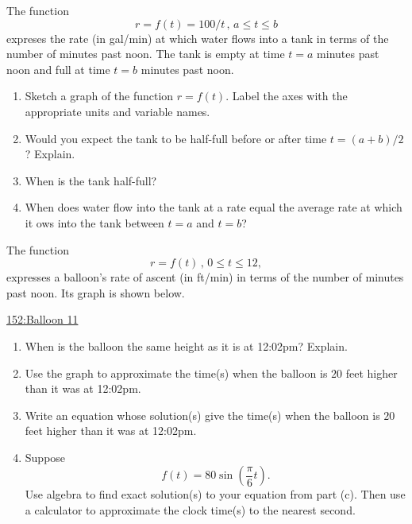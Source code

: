 \documentclass{ximera}
\begin{document}
\begin{question} \label{QLkdR343RE}
The function 
\[
r = f(t) = 100/t \, , \, a \leq  t \leq b
\]
expreses the rate (in gal/min) at which water flows into a tank in terms of the number of minutes past noon. The tank
 is empty at time $t = a$ minutes past noon and full at time $t = b$ minutes past noon.

\begin{enumerate}
\item Sketch a graph of the function $r = f(t)$. Label the axes with the appropriate units and variable names.

\item Would you expect the tank to be half-full before or after time $t = (a+b)/2$? Explain.

\item When is the tank half-full?

\item  When does water flow into the tank at a rate equal the average rate at which it ows into the tank between $t = a$ and $t = b$?

\end{enumerate}
\end{question}


\begin{question} \label{QPLDFRr3}
The function 
\[
     r = f(t) \, , \, 0\leq t \leq 12,
\]
expresses a balloon's rate of ascent (in ft/min) in terms of the number of minutes past noon. Its graph is shown below.

\begin{onlineOnly}
    \begin{center}
\end{center}
\end{onlineOnly}

\href{https://www.desmos.com/calculator/yp3awkyck8}{152:Balloon 11}

\begin{enumerate}
\item When is the balloon the same height as it is at 12:02pm? Explain.

\item Use the graph to approximate the time(s) when the balloon is $20$ feet higher than it was at 12:02pm.

\item Write an equation whose solution(s) give the time(s) when the balloon is $20$ feet higher than it was at 12:02pm.

\item Suppose
\[
      f(t)=80\sin\left( \frac{\pi}{6}t \right) .
\]
Use algebra to find exact solution(s) to your equation from part (c). Then use a calculator to approximate the clock time(s) to the nearest second.
\end{enumerate}

\end{question}
\end{document}
